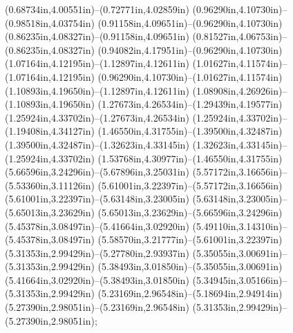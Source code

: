 (0.68734in,4.00551in)--(0.72771in,4.02859in) (0.96290in,4.10730in)--(0.98518in,4.03754in) (0.91158in,4.09651in)--(0.96290in,4.10730in) (0.86235in,4.08327in)--(0.91158in,4.09651in) (0.81527in,4.06753in)--(0.86235in,4.08327in) (0.94082in,4.17951in)--(0.96290in,4.10730in) (1.07164in,4.12195in)--(1.12897in,4.12611in) (1.01627in,4.11574in)--(1.07164in,4.12195in) (0.96290in,4.10730in)--(1.01627in,4.11574in) (1.10893in,4.19650in)--(1.12897in,4.12611in) (1.08908in,4.26926in)--(1.10893in,4.19650in) (1.27673in,4.26534in)--(1.29439in,4.19577in) (1.25924in,4.33702in)--(1.27673in,4.26534in) (1.25924in,4.33702in)--(1.19408in,4.34127in) (1.46550in,4.31755in)--(1.39500in,4.32487in) (1.39500in,4.32487in)--(1.32623in,4.33145in) (1.32623in,4.33145in)--(1.25924in,4.33702in) (1.53768in,4.30977in)--(1.46550in,4.31755in) (5.66596in,3.24296in)--(5.67896in,3.25031in) (5.57172in,3.16656in)--(5.53360in,3.11126in) (5.61001in,3.22397in)--(5.57172in,3.16656in) (5.61001in,3.22397in)--(5.63148in,3.23005in) (5.63148in,3.23005in)--(5.65013in,3.23629in) (5.65013in,3.23629in)--(5.66596in,3.24296in) (5.45378in,3.08497in)--(5.41664in,3.02920in) (5.49110in,3.14310in)--(5.45378in,3.08497in) (5.58570in,3.21777in)--(5.61001in,3.22397in) (5.31353in,2.99429in)--(5.27780in,2.93937in) (5.35055in,3.00691in)--(5.31353in,2.99429in) (5.38493in,3.01850in)--(5.35055in,3.00691in) (5.41664in,3.02920in)--(5.38493in,3.01850in) (5.34945in,3.05166in)--(5.31353in,2.99429in) (5.23169in,2.96548in)--(5.18694in,2.94914in) (5.27390in,2.98051in)--(5.23169in,2.96548in) (5.31353in,2.99429in)--(5.27390in,2.98051in);
